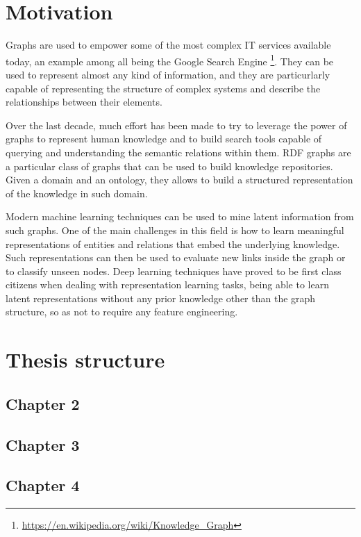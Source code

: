 \documentclass[%
    corpo=13.5pt,
    twoside,
    oldstyle,
    tipotesi=magistrale,
    greek,
    evenboxes
]{toptesi}
\begin{document}
\section{Motivation}

Graphs are used to empower some of the most complex IT services available
today, an example among all being the Google Search Engine
\footnote{\url{https://en.wikipedia.org/wiki/Knowledge_Graph}}.
They can be used to represent almost any kind of information, and they are
particurlarly capable of representing the structure of complex systems and
describe the relationships between their elements.

Over the last decade, much effort has been made to try to leverage the power
of graphs to represent human knowledge and to build search tools capable of
querying and understanding the semantic relations within them. RDF graphs are a
particular class of graphs that can be used to build knowledge
repositories. Given a domain and an ontology, they allows to build a structured
representation of the knowledge in such domain.

Modern machine learning techniques can be used to mine latent information
from such graphs. One of the main challenges in this field is how to learn
meaningful representations of entities and relations that embed
the underlying knowledge. Such representations can then be used to evaluate
new links inside the graph or to classify unseen nodes.
Deep learning techniques have proved to be first class citizens when
dealing with representation learning tasks, being able to learn latent
representations without any prior knowledge other than the graph structure,
so as not to require any feature engineering.



\section{Thesis structure}

\subsection{Chapter 2}

\subsection{Chapter 3}

\subsection{Chapter 4}
\end{document}
